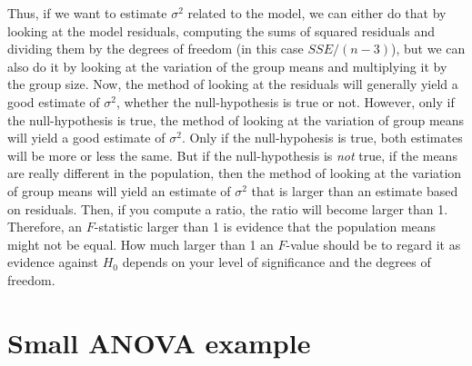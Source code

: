 \documentclass[]{book}\usepackage[]{graphicx}\usepackage[]{color}
\begin{document}
Thus, if we want to estimate $\sigma^2$ related to the model, we can either do that by looking at the model residuals, computing the sums of squared residuals and dividing them by the degrees of freedom (in this case $SSE/(n-3)$), but we can also do it by looking at the variation of the group means and multiplying it by the group size. Now, the method of looking at the residuals will generally yield a good estimate of $\sigma^2$, whether the null-hypothesis is true or not. However, only if the null-hypothesis is true, the method of looking at the variation of group means will yield a good estimate of $\sigma^2$. Only if the null-hypohesis is true, both estimates will be more or less the same. But if the null-hypothesis is \textit{not} true, if the means are really different in the population, then the method of looking at the variation of group means will yield an estimate of $\sigma^2$ that is larger than an estimate based on residuals. Then, if you compute a ratio, the ratio will become larger than 1. Therefore, an $F$-statistic larger than 1 is evidence that the population means might not be equal. How much larger than 1 an $F$-value should be to regard it as evidence against $H_0$ depends on your level of significance and the degrees of freedom. 


% 
% 


\section{Small ANOVA example}
\end{document}
